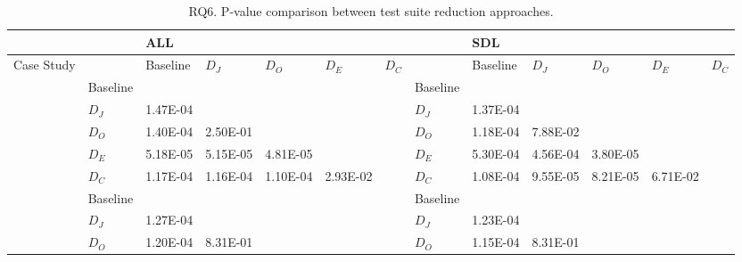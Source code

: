 \begin{table*}
\tiny
\centering
\caption{RQ6. P-value comparison between test suite reduction approaches.}
\label{table:results:pValComparisonTSredPrior} 
\begin{tabular}{|l|l|lllll|l|lllll|}
\hline
           &          & ALL      &                       &                       &          &      &          & SDL      &                       &                       &                       &       \\
\hline           
Case Study &          & Baseline & $D_J$                  & $D_O$                  & $D_E$     & $D_C$ &          & Baseline & $D_J$                  & $D_O$                  & $D_E$                  & $D_C$  \\
\hline
\GCSP{}   & Baseline &          &                       &                       &          &      & Baseline &          &                       &                       &                       &       \\
           & $D_J$     & 1.47E-04 &                       &                       &          &      & $D_J$     & 1.37E-04 &                       &                       &                       &       \\
           & $D_O$     & 1.40E-04 & 2.50E-01              &                       &          &      & $D_O$     & 1.18E-04 & 7.88E-02              &                       &                       &       \\
           & $D_E$     & 5.18E-05 & 5.15E-05              & 4.81E-05              &          &      & $D_E$     & 5.30E-04 & 4.56E-04              & 3.80E-05              &                       &       \\
           & $D_C$     & 1.17E-04 & 1.16E-04              & 1.10E-04              & 2.93E-02 &      & $D_C$     & 1.08E-04 & 9.55E-05              & 8.21E-05              & 6.71E-02              &       \\
\hline
\UTIL{}    & Baseline &          &                       &                       &          &      & Baseline &          &                       &                       &                       &       \\
           & $D_J$     & 1.27E-04 &                       &                       &          &      & $D_J$     & 1.23E-04 &                       &                       &                       &       \\
           & $D_O$     & 1.20E-04 & 8.31E-01              &                       &          &      & $D_O$     & 1.15E-04 & 8.31E-01              &                       &                       &       \\

\end{tabular}
\end{table*}
